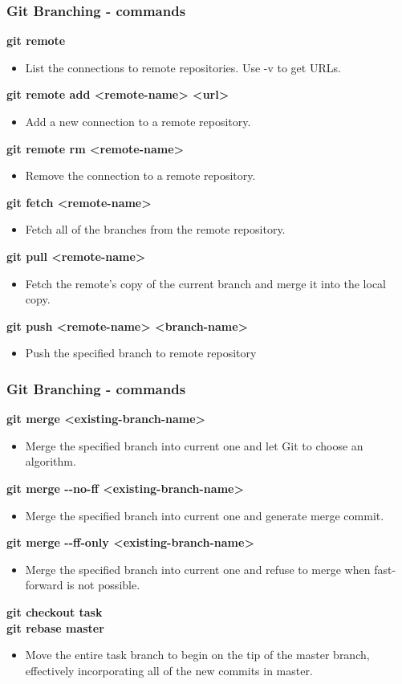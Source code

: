 \begin{frame}
\frametitle{Git Branching - commands}
\textbf{git remote}
	\begin{itemize}
	\item List the connections to remote repositories. Use -v to get URLs. 
	\end{itemize}
\textbf{git remote add <remote-name> <url>}
	\begin{itemize}
	\item Add a new connection to a remote repository.
	\end{itemize}
\textbf{git remote rm <remote-name>}
	\begin{itemize}
 	\item Remove the connection to a remote repository.
	\end{itemize}
\textbf{git fetch <remote-name>}
	\begin{itemize}
	\item Fetch all of the branches from the remote repository.
	\end{itemize}
\textbf{git pull <remote-name>}
	\begin{itemize}
	\item Fetch the remote’s copy of the current branch and merge it into the local copy.
	\end{itemize}
\textbf{git push <remote-name> <branch-name>}
	\begin{itemize}
	\item Push the specified branch to remote repository
	\end{itemize}
\end{frame}

\begin{frame}
\frametitle{Git Branching - commands}
\textbf{git merge <existing-branch-name>}
	\begin{itemize}
	\item Merge the specified branch into current one and let Git to choose an algorithm.
	\end{itemize}
\textbf{git merge -{}-no-ff <existing-branch-name>}
	\begin{itemize}
	\item Merge the specified branch into current one and generate merge commit.
	\end{itemize}
\textbf{git merge -{}-ff-only <existing-branch-name>}
	\begin{itemize}
	\item Merge the specified branch into current one and refuse to merge when fast-forward is not possible.
	\end{itemize}
\textbf{git checkout task} \\
\textbf{git rebase master}
	\begin{itemize}
	\item Move the entire task branch to begin on the tip of the master branch, effectively incorporating all of the new commits in master.
	\end{itemize}
\end{frame}